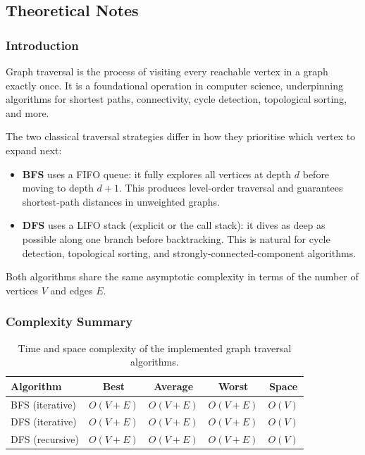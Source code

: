 \subsection{Theoretical Notes}

\subsubsection{Introduction}
Graph traversal is the process of visiting every reachable vertex in a graph exactly once. It is a foundational operation in computer science, underpinning algorithms for shortest paths, connectivity, cycle detection, topological sorting, and more.

The two classical traversal strategies differ in how they prioritise which vertex to expand next:
\begin{itemize}
    \item \textbf{BFS} uses a FIFO queue: it fully explores all vertices at depth $d$ before moving to depth $d+1$. This produces level-order traversal and guarantees shortest-path distances in unweighted graphs.
    \item \textbf{DFS} uses a LIFO stack (explicit or the call stack): it dives as deep as possible along one branch before backtracking. This is natural for cycle detection, topological sorting, and strongly-connected-component algorithms.
\end{itemize}

Both algorithms share the same asymptotic complexity in terms of the number of vertices $V$ and edges $E$.

\subsubsection{Complexity Summary}

\begin{table}[h]
\centering
\caption{Time and space complexity of the implemented graph traversal algorithms.}
\label{tab:complexity}
\begin{tabular}{|l|c|c|c|c|}
\hline
\textbf{Algorithm} & \textbf{Best} & \textbf{Average} & \textbf{Worst} & \textbf{Space} \\
\hline
BFS (iterative)            & $O(V + E)$ & $O(V + E)$ & $O(V + E)$ & $O(V)$ \\
\hline
DFS (iterative)            & $O(V + E)$ & $O(V + E)$ & $O(V + E)$ & $O(V)$ \\
\hline
DFS (recursive)            & $O(V + E)$ & $O(V + E)$ & $O(V + E)$ & $O(V)$ \\
\hline
\end{tabular}
\end{table}

